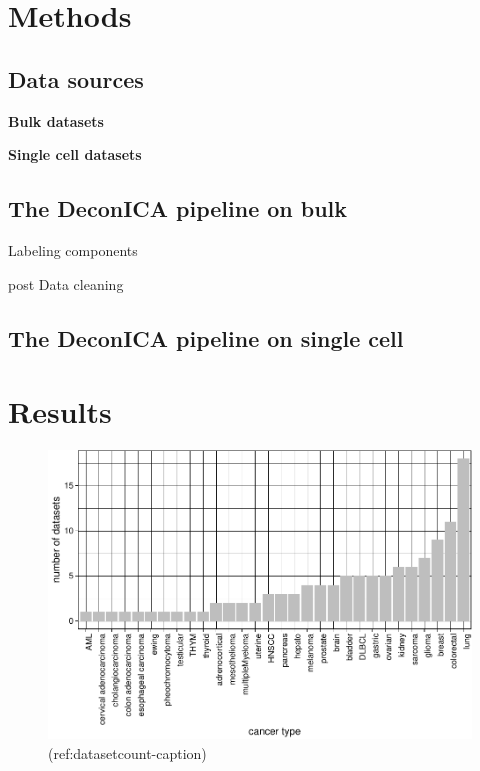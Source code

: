 \documentclass[12pt,]{book}
\theoremstyle{definition}
\theoremstyle{definition}
\theoremstyle{definition}
\theoremstyle{remark}
\begin{document}
\hypertarget{methods-1}{%
\section{Methods}\label{methods-1}}

\hypertarget{data-sources}{%
\subsection{Data sources}\label{data-sources}}

\textbf{Bulk datasets}

\textbf{Single cell datasets}

\hypertarget{the-deconica-pipeline-on-bulk}{%
\subsection{The DeconICA pipeline on
bulk}\label{the-deconica-pipeline-on-bulk}}

Labeling components

post Data cleaning

\hypertarget{the-deconica-pipeline-on-single-cell}{%
\subsection{The DeconICA pipeline on single
cell}\label{the-deconica-pipeline-on-single-cell}}

\hypertarget{results-1}{%
\section{Results}\label{results-1}}

\begin{figure}

{\centering \includegraphics[width=0.8\linewidth]{UCzPhDThesis_files/figure-latex/datasetcount-1} 

}

\caption[Count of the dasets analyzed with DeconICA]{(ref:datasetcount-caption)}\label{fig:datasetcount}
\end{figure}
\end{document}
